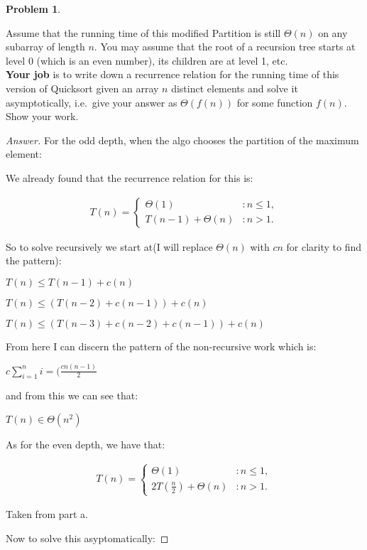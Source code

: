 \documentclass[11pt]{article}
\theoremstyle{definition}
\theoremstyle{definition}
\newtheorem{required}{Problem}
\theoremstyle{definition}
\begin{document}
\begin{required}
\begin{enumerate}[label=(\alph*)]
\noindent Assume that the running time of this modified {\sc Partition} is still $\Theta(n)$ on any subarray of length $n$. You may assume that the root of a recursion tree starts at level $0$ (which is an even number), its children are at level 1, etc. \\
  
\noindent \textbf{Your job} is to write down a recurrence relation for the running time of this version of {\sc Quicksort} given an array $n$ distinct elements and solve it asymptotically, i.e.\ give your answer as $\Theta(f(n))$ for some function $f(n)$. Show your work.

\begin{proof}[Answer]


For the odd depth, when the algo chooses the partition of the maximum element:


We already found that the recurrence relation for this is:

\begin{align*}
T(n) = \begin{cases}
\text{$\Theta(1)$} & : n \leq 1, \\
\text{$T(n-1)+\Theta(n)$} & : n >1.
\end{cases}
\end{align*}

So to solve recursively we start at(I will replace $\Theta(n)$ with $cn$ for clarity to find the pattern):

$T(n)\leq T(n-1)+c(n)$

$T(n)\leq (T(n-2) + c(n-1)) + c(n)$

$T(n)\leq (T(n-3) + c(n-2)+c(n-1)) + c(n)$

From here I can discern the pattern of the non-recursive work which is:

$c\sum_{i=1}^n i = (\frac{cn(n-1)}{2}$

and from this we can see that:

$T(n)\in \Theta(n^2)$

As for the even depth, we have that:


\begin{align*}
T(n) = \begin{cases}
\text{$\Theta(1)$} & : n \leq 1, \\
\text{$2T(\frac{n}{2})+\Theta(n)$} & : n > 1.
\end{cases}
\end{align*}

Taken from part a.

Now to solve this asyptomatically:


\end{proof}
\end{enumerate}
\end{required}
\end{document}
